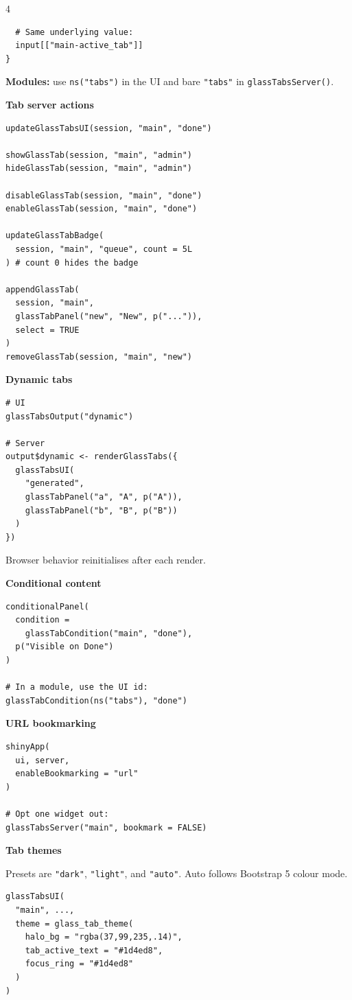 \documentclass[9pt,a4paper]{article}
\newcommand{\code}[1]{\texttt{\footnotesize\color{codefg}#1}}
\newcommand{\gtfn}[1]{\texttt{\footnotesize\color{codekw}#1()}}
\newcommand{\gtval}[1]{\texttt{\footnotesize\color{gtyellow}#1}}
\newcommand{\mysection}[1]{%
  \vspace{3pt}%
  \noindent\colorbox{sectionbg}{%
    \parbox{\dimexpr\linewidth-2\fboxsep\relax}{%
      \strut\textbf{\small\color{white}#1}\strut%
    }%
  }%
  \vspace{2pt}\par%
}
\begin{document}
\begin{multicols*}{4}
\begin{lstlisting}
  # Same underlying value:
  input[["main-active_tab"]]
}
\end{lstlisting}

\textbf{Modules:} use \code{ns("tabs")} in the UI and bare
\code{"tabs"} in \gtfn{glassTabsServer}.

\mysection{Tab server actions}

\begin{lstlisting}
updateGlassTabsUI(session, "main", "done")

showGlassTab(session, "main", "admin")
hideGlassTab(session, "main", "admin")

disableGlassTab(session, "main", "done")
enableGlassTab(session, "main", "done")

updateGlassTabBadge(
  session, "main", "queue", count = 5L
) # count 0 hides the badge

appendGlassTab(
  session, "main",
  glassTabPanel("new", "New", p("...")),
  select = TRUE
)
removeGlassTab(session, "main", "new")
\end{lstlisting}

\columnbreak
\mysection{Dynamic tabs}

\begin{lstlisting}
# UI
glassTabsOutput("dynamic")

# Server
output$dynamic <- renderGlassTabs({
  glassTabsUI(
    "generated",
    glassTabPanel("a", "A", p("A")),
    glassTabPanel("b", "B", p("B"))
  )
})
\end{lstlisting}
Browser behavior reinitialises after each render.

\mysection{Conditional content}

\begin{lstlisting}
conditionalPanel(
  condition =
    glassTabCondition("main", "done"),
  p("Visible on Done")
)

# In a module, use the UI id:
glassTabCondition(ns("tabs"), "done")
\end{lstlisting}

\mysection{URL bookmarking}

\begin{lstlisting}
shinyApp(
  ui, server,
  enableBookmarking = "url"
)

# Opt one widget out:
glassTabsServer("main", bookmark = FALSE)
\end{lstlisting}

\mysection{Tab themes}

Presets are \gtval{"dark"}, \gtval{"light"}, and
\gtval{"auto"}. Auto follows Bootstrap 5 colour mode.
\begin{lstlisting}
glassTabsUI(
  "main", ...,
  theme = glass_tab_theme(
    halo_bg = "rgba(37,99,235,.14)",
    tab_active_text = "#1d4ed8",
    focus_ring = "#1d4ed8"
  )
)
\end{lstlisting}


\end{multicols*}
\end{document}

